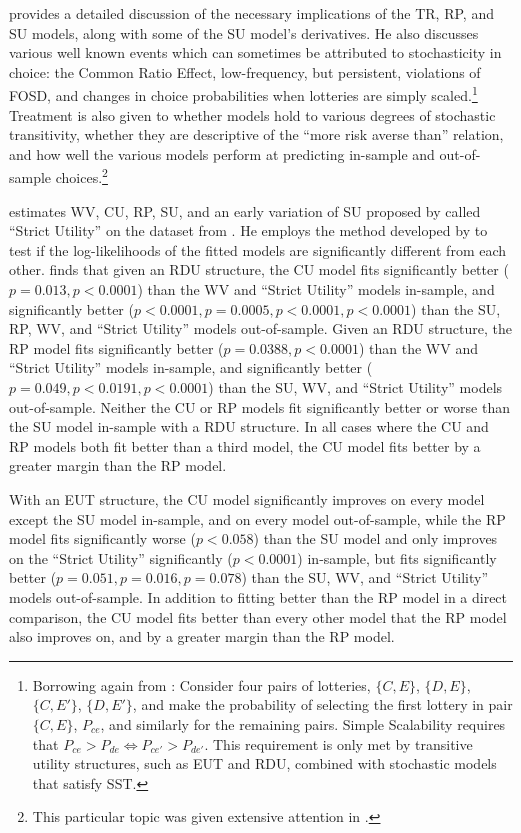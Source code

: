 \documentclass[../main.tex]{subfiles}
\begin{document}
\textcite{Wilcox2008} provides a detailed discussion of the necessary implications of the TR, RP,  and SU models, along with some of the SU model's derivatives.
He also discusses various well known events which can sometimes be attributed to stochasticity in choice: the Common Ratio Effect, low-frequency, but persistent, violations of FOSD, and changes in choice probabilities when lotteries are simply scaled.\footnote{ Borrowing again from \textcite[249]{Wilcox2008}: Consider four pairs of lotteries, $\{C,E\}$, $\{D,E\}$,$\{C,E'\}$, $\{D,E'\}$, and make the probability of selecting the first lottery in pair $\{C,E\}$, $P_{\mathit{ce}}$, and similarly for the remaining pairs.
Simple Scalability requires that $P_{\mathit{ce}} > P_{\mathit{de}} \iff P_{\mathit{ce}'} > P_{\mathit{de}'}$.
This requirement is only met by transitive utility structures, such as EUT and RDU, combined with stochastic models that satisfy SST.}
Treatment is also given to whether models hold to various degrees of stochastic transitivity, whether they are descriptive of the \enquote{more risk averse than} relation, and how well the various models perform at predicting in-sample and out-of-sample choices.\footnote{ This particular topic was given extensive attention in \textcite{Wilcox2007}.}

\textcite{Wilcox2008} estimates WV, CU, RP, SU, and an early variation of SU proposed by \textcite{Luce1958} called \enquote{Strict Utility} on the dataset from \textcite{Hey2001}.
He employs the  method developed by \textcite{Vuong1989} to test if the log-likelihoods of the fitted models are significantly different from each other.
\textcite[273]{Wilcox2008} finds that given an RDU structure, the CU model fits significantly better ($p=0.013,p<0.0001$) than the WV and \enquote{Strict Utility} models in-sample, and significantly better ($p<0.0001, p=0.0005, p<0.0001, p<0.0001$) than the SU, RP, WV, and \enquote{Strict Utility} models out-of-sample.
Given an RDU structure, the RP model fits significantly better ($p=0.0388,p<0.0001$) than the WV and \enquote{Strict Utility} models in-sample, and significantly better ($p=0.049, p<0.0191, p<0.0001$) than the SU, WV, and \enquote{Strict Utility} models out-of-sample.
Neither the CU or RP models fit significantly better or worse than the SU model in-sample with a RDU structure.
In all cases where the CU and RP models both fit better than a third model, the CU model fits better by a greater margin than the RP model.

With an EUT structure, the CU model significantly improves on every model except the SU model in-sample, and on every model out-of-sample, while the RP model fits significantly worse ($p<0.058$) than the SU model and only improves on the \enquote{Strict Utility} significantly ($p<0.0001$) in-sample, but fits significantly better ($p=0.051,p=0.016,p=0.078$) than the SU, WV, and \enquote{Strict Utility} models out-of-sample.
In addition to fitting better than the RP model in a direct comparison, the CU model fits better than every other model that the RP model also improves on, and by a greater margin than the RP model.
\end{document}
